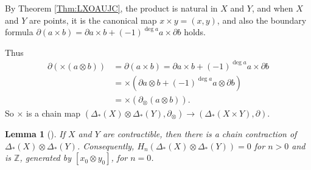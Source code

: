 \documentclass[reqno]{amsart}
\newtheorem{lemma}[theorem]{Lemma}
\theoremstyle{definition}
\theoremstyle{remark}
\begin{document}
By Theorem \ref{Thm:LXOAUJC}, the
product is natural in $X$ and $Y$, and when
$X$ and $Y$ are points, it is the canonical map
$x \times y = (x,y)$, and also the boundary formula
$\partial \left( a \times b \right) =
\partial a \times b + (-1)^{\deg a} a \times \partial b$ holds.

Thus
\begin{align*}
    \partial \left( \times (a \otimes b) \right) 
    &= \partial (a \times b) = 
    \partial a \times b + (-1)^{\deg a} a \times \partial b\\
    &= \times  \left( \partial a \otimes b+
    (-1)^{\deg a} a \otimes \partial b\right) \\
    &= \times \left( \partial_{\otimes} 
    (a \otimes b)\right) .
\end{align*}
So $\times $ is a chain map 
$\left( \Delta_{*}(X) \otimes \Delta_*(Y), \partial_{\otimes}
\right) \to 
\left( \Delta_*(X \times  Y), \partial \right) $.

\begin{lemma}[]
    If $X$ and $Y$ are contractible, then there is a chain
    contraction of
    $\Delta_*(X) \otimes \Delta_*(Y)$. Consequently,
    $H_n\left( \Delta_*(X) \otimes \Delta_*(Y) \right) = 0$ for
    $n>0$ and is $\mathbb{Z}$, generated by
    $\left[ x_0 \otimes y_0 \right] $, for $n=0$.
\end{lemma}
\end{document}
